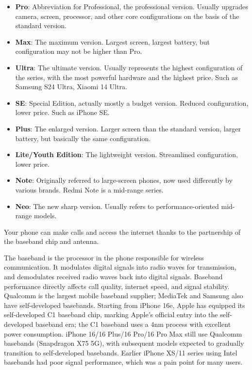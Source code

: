 
\begin{itemize}
  \item \textbf{Pro}: Abbreviation for Professional, the professional version. Usually upgrades camera, screen, processor, and other core configurations on the basis of the standard version.
  \item \textbf{Max}: The maximum version. Largest screen, largest battery, but configuration may not be higher than Pro.
  \item \textbf{Ultra}: The ultimate version. Usually represents the highest configuration of the series, with the most powerful hardware and the highest price. Such as Samsung S24 Ultra, Xiaomi 14 Ultra.
  \item \textbf{SE}: Special Edition, actually mostly a budget version. Reduced configuration, lower price. Such as iPhone SE.
  \item \textbf{Plus}: The enlarged version. Larger screen than the standard version, larger battery, but basically the same configuration.
  \item \textbf{Lite/Youth Edition}: The lightweight version. Streamlined configuration, lower price.
  \item \textbf{Note}: Originally referred to large-screen phones, now used differently by various brands. Redmi Note is a mid-range series.
  \item \textbf{Neo}: The new sharp version. Usually refers to performance-oriented mid-range models.
\end{itemize}


Your phone can make calls and access the internet thanks to the partnership of the baseband chip and antenna.


The baseband is the processor in the phone responsible for wireless communication. It modulates digital signals into radio waves for transmission, and demodulates received radio waves back into digital signals. Baseband performance directly affects call quality, internet speed, and signal stability. Qualcomm is the largest mobile baseband supplier; MediaTek and Samsung also have self-developed basebands. Starting from iPhone 16e, Apple has equipped its self-developed C1 baseband chip, marking Apple's official entry into the self-developed baseband era; the C1 baseband uses a 4nm process with excellent power consumption. iPhone 16/16 Plus/16 Pro/16 Pro Max still use Qualcomm basebands (Snapdragon X75 5G), with subsequent models expected to gradually transition to self-developed basebands. Earlier iPhone XS/11 series using Intel basebands had poor signal performance, which was a pain point for many users.

